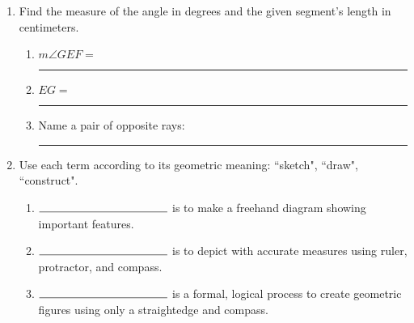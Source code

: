 \documentclass[12pt, twoside]{article}
\begin{document}
\begin{enumerate}[itemsep=0.5cm]
\item Find the measure of the angle in degrees and the given segment's length in centimeters. \vspace{0.25cm}
\begin{enumerate}
  \item  $m \angle GEF = $ \rule{4cm}{0.15mm} \bigskip
  \item  $EG=$ \rule{4cm}{0.15mm} \bigskip
  \item Name a pair of opposite rays: \rule{4cm}{0.15mm} \bigskip
\end{enumerate}
\begin{center}
\end{center}

\item Use each term according to its geometric meaning: ``sketch", ``draw", ``construct".
\begin{enumerate}
  \item $\rule{4cm}{0.15mm}$ is to make a freehand diagram showing important features. \smallskip
  \item $\rule{4cm}{0.15mm}$ is to depict with accurate measures using ruler, protractor, and compass. \smallskip
  \item $\rule{4cm}{0.15mm}$ is a formal, logical process to create geometric figures using only a straightedge and compass.
\end{enumerate} \smallskip


\end{enumerate}
\end{document}
